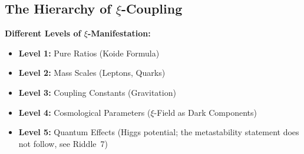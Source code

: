 	\subsection{The Hierarchy of $\xi$-Coupling}
	\textbf{Different Levels of $\xi$-Manifestation:}
	\begin{itemize}
		\item \textbf{Level 1:} Pure Ratios (Koide Formula)
		\item \textbf{Level 2:} Mass Scales (Leptons, Quarks)
		\item \textbf{Level 3:} Coupling Constants (Gravitation)
		\item \textbf{Level 4:} Cosmological Parameters ($\xi$-Field as Dark Components)
		\item \textbf{Level 5:} Quantum Effects (Higgs potential; the metastability statement does not follow, see Riddle~7)
	\end{itemize}

